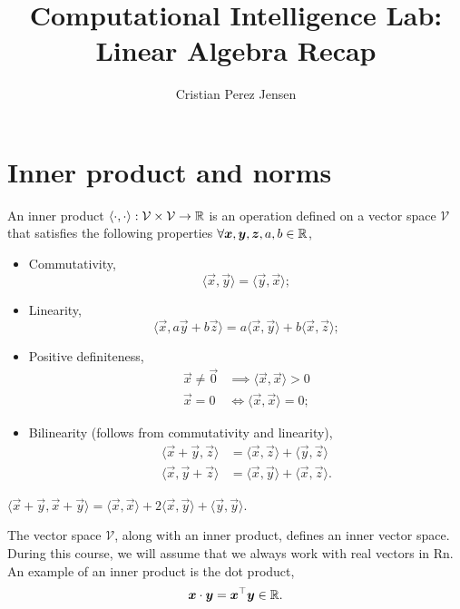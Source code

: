 \documentclass[justified,nobib]{tufte-handout}
\title{Computational Intelligence Lab: Linear Algebra Recap}
\author{Cristian Perez Jensen}
\newcommand{\ang}[1]{\langle #1 \rangle}
\begin{document}
\maketitle
\newpage
\tableofcontents
\newpage{}

\section{Inner product and norms}

\begin{definition}
    An inner product $\ang{\cdot,\cdot}: \mathcal{V} \times \mathcal{V} \to \R$ is an operation
    defined on a vector space $\mathcal{V}$ that satisfies the following properties $\forall \bm{x},\bm{y},\bm{z},a,b\in \mathbb{R}$,
    \begin{itemize}
        \item Commutativity, \[
                  \ang{\vec{x},\vec{y}} = \ang{\vec{y},\vec{x}};
              \]
        \item Linearity, \[
                  \ang{\vec{x},a \vec{y} + b \vec{z}} = a \ang{\vec{x},\vec{y}} + b\ang{\vec{x},\vec{z}};
              \]
        \item Positive definiteness,
              \begin{align*}
                  \vec{x} \neq \vec{0} & \implies \ang{\vec{x},\vec{x}} > 0 \\
                  \vec{x} = 0          & \iff \ang{\vec{x},\vec{x}} = 0;
              \end{align*}
        \item Bilinearity (follows from commutativity and linearity),
              \begin{align*}
                  \ang{\vec{x} + \vec{y}, \vec{z}} & = \ang{\vec{x},\vec{z}} + \ang{\vec{y},\vec{z}}  \\
                  \ang{\vec{x},\vec{y} + \vec{z}}  & = \ang{\vec{x},\vec{y}} + \ang{\vec{x},\vec{z}}.
              \end{align*}
    \end{itemize}
\end{definition}

\begin{corollary}
    $\ang{\vec{x}+\vec{y},\vec{x}+\vec{y}} = \ang{\vec{x},\vec{x}} + 2\ang{\vec{x},\vec{y}} + \ang{\vec{y},\vec{y}}$.
\end{corollary}

The vector space $\mathcal{V}$, along with an inner product, defines an inner vector space. During
this course, we will assume that we always work with real vectors in Rn. An example of an inner
product is the dot product, \[
    \bm{x}\cdot \bm{y} = \bm{x}^\top \bm{y} \in \mathbb{R}.
\]
\end{document}
